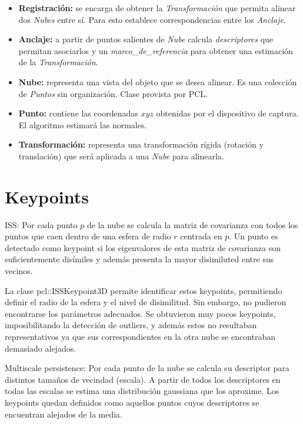 		\begin{itemize}
			\item {\bfseries Registración:} se encarga de obtener la \emph{Transformación} que
				permita alinear dos \emph{Nubes} entre sí.  Para esto establece
				correspondencias entre los \emph{Anclaje}.
			\item {\bfseries Anclaje:} a partir de puntos salientes de \emph{Nube} calcula
				\emph{descriptores}  que permitan asociarlos y un
				\emph{marco\_de\_referencia} para obtener una estimación de la
				\emph{Transformación}.
			\item {\bfseries Nube:} representa una vista del objeto que se desea alinear.
				Es una colección de \emph{Puntos} sin organización. Clase
				provista por PCL.
			\item {\bfseries Punto:} contiene las coordenadas $xyz$ obtenidas por el
				dispositivo de captura. El algoritmo estimará las normales.
			\item {\bfseries Transformación:} representa una transformación rígida
				(rotación y translación) que será aplicada a una \emph{Nube}
				para alinearla.
		\end{itemize}

	\section{Keypoints}
	

		ISS:
		Por cada punto $p$ de la nube se calcula la matriz de covarianza con
		todos los puntos que caen dentro de una esfera de radio $r$ centrada en
		$p$.
		Un punto es detectado como keypoint si los eigenvalores de esta matriz
		de covarianza son suficientemente disímiles y además presenta la mayor disimiluted entre sus vecinos.

		La clase pcl::ISSKeypoint3D permite identificar estos keypoints, permitiendo definir el radio de la esfera y el nivel de disimilitud.
		Sin embargo, no pudieron encontrarse los parámetros adecuados.
		Se obtuvieron muy pocos keypoints, imposibilitando la detección de outliers,
		y además estos no resultaban representativos ya que sus correspondientes en la otra nube se encontraban demasiado alejados.

		Multiscale persistence:
		Por cada punto de la nube se calcula su descriptor para distintos tamaños de vecindad (escala).
		A partir de todos los descriptores en todas las escalas se estima una distribución gaussiana que los aproxime.
		Los keypoints quedan definidos como aquellos puntos cuyos descriptores se encuentran alejados de la media.

